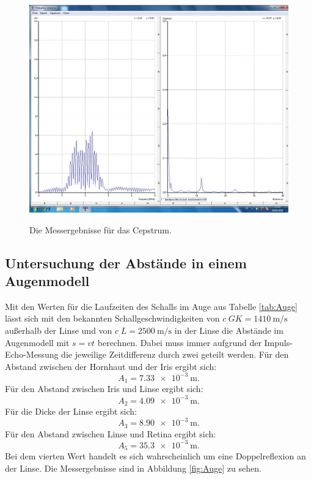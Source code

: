 \begin{figure}
	\centering
	\caption{Die Messergebnisse für das Cepstrum.}
	\includegraphics[width=\linewidth-70pt,height=\textheight-70pt,keepaspectratio]{content/images/CEPSTRUM.jpg}
	\label{fig:Cepstrum}
\end{figure}

\subsection{Untersuchung der Abstände in einem Augenmodell}

\noindent Mit den Werten für die Laufzeiten des Schalls im Auge aus Tabelle \ref{tab:Auge} lässt sich mit den bekannten Schallgeschwindigkeiten von $c_.{GK}=\SI{1410}{\meter\per\second}$ \cite{US1} außerhalb der Linse und von $c_.{L}=\SI{2500}{\meter\per\second}$ \cite{US1} in der Linse die Abstände im Augenmodell mit $s=vt$ berechnen. Dabei muss immer aufgrund der Impuls-Echo-Messung die jeweilige Zeitdifferenz durch zwei geteilt werden. Für den Abstand zwischen der Hornhaut und der Iris ergibt sich:
\begin{equation*}
A_1=\SI{7.33e-3}{\meter}\text{.}
\end{equation*}
Für den Abstand zwischen Iris und Linse ergibt sich:
\begin{equation*}
A_2=\SI{4.09e-3}{\meter}\text{.}
\end{equation*}
Für die Dicke der Linse ergibt sich:
\begin{equation*}
A_3=\SI{8.90e-3}{\meter}\text{.}
\end{equation*}
Für den Abstand zwischen Linse und Retina ergibt sich:
\begin{equation*}
A_5=\SI{35,3e-3}{\meter}\text{.}
\end{equation*}
Bei dem vierten Wert handelt es sich wahrscheinlich um eine Doppelreflexion an der Linse.
Die Messergebnisse sind in Abbildung \ref{fig:Auge} zu sehen.


